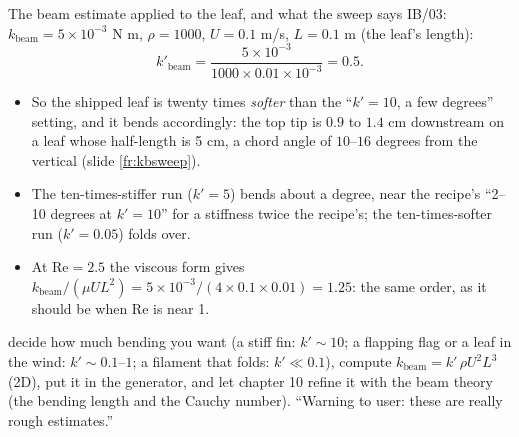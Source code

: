 \documentclass[aspectratio=169,11pt]{beamer}
\begin{document}
\begin{frame}{The beam estimate applied to the leaf, and what the sweep says}
\label{fr:kbeam2}
\small IB/03: $k_{\mathrm{beam}} = 5\times10^{-3}$ N m, $\rho = 1000$, $U = 0.1$ m/s, $L = 0.1$ m (the leaf's length):
\[
  k'_{\mathrm{beam}} = \frac{5\times10^{-3}}{1000 \times 0.01 \times 10^{-3}} = 0.5 .
\]
\begin{itemize}
  \item So the shipped leaf is twenty times \emph{softer} than the ``$k' = 10$, a few degrees'' setting, and it bends accordingly: the top tip is $0.9$ to $1.4$ cm downstream on a leaf whose half-length is 5 cm, a chord angle of $10$--$16$ degrees from the vertical (slide \ref{fr:kbsweep}).
  \item The ten-times-stiffer run ($k' = 5$) bends about a degree, near the recipe's ``2--10 degrees at $k' = 10$'' for a stiffness twice the recipe's; the ten-times-softer run ($k' = 0.05$) folds over.
  \item At $\mathrm{Re} = 2.5$ the viscous form gives $k_{\mathrm{beam}}/(\mu U L^2) = 5\times10^{-3}/(4\times0.1\times0.01) = 1.25$: the same order, as it should be when $\mathrm{Re}$ is near 1.
\end{itemize}
\begin{punchbox}
\footnotesize {} decide how much bending you want (a stiff fin: $k' \sim 10$; a flapping flag or a leaf in the wind: $k' \sim 0.1$--$1$; a filament that folds: $k' \ll 0.1$), compute $k_{\mathrm{beam}} = k'\,\rho U^2 L^3$ (2D), put it in the generator, and let chapter 10 refine it with the beam theory (the bending length and the Cauchy number). ``Warning to user: these are really rough estimates.''
\end{punchbox}
\end{frame}
\end{document}
